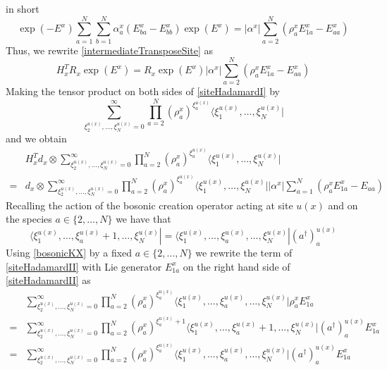 \documentclass[10pt]{article}
\numberwithin{equation}{section}
\numberwithin{equation}{subsection}
\begin{document}
in short
\begin{equation}\label{HadTransfBoundary}
\exp{(-E^{x})}\sum_{a=1}^{N}\sum_{b=1}^{N}\alpha_{a}^{x}\left(E_{b a}^{x}-E_{bb}^{x}\right)\exp{(E^{x})}=	|\alpha^{x}|\sum_{a=2}^{N}\left(\rho_{a}^{x}E_{1a}^{x}-E_{aa}^{x}\right)
\end{equation}
Thus, we rewrite \eqref{intermediateTransposeSite} as
\begin{equation}\label{siteHadamardI}
H_{x}^{T}R_{x}\exp{(E^{x})}=R_{x}\exp{(E^{x})}|\alpha^{x}|\sum_{a=2}^{N}\left(\rho_{a}^{x}E_{1a}^{x}-E_{aa}^{x}\right)
\end{equation}
Making the tensor product on both sides of \eqref{siteHadamardI} by 
\begin{equation}
\sum_{\xi_{2}^{u(x)},\ldots,\xi_{N}^{u(x)}=0}^{\infty}\prod_{a=2}^{N}\left(\rho_{a}^{x}\right)^{\xi_{a}^{u(x)}}\langle \xi_{1}^{u(x)},\ldots,\xi_{N}^{u(x)}|
\end{equation}
and we obtain 
\begin{equation}\label{siteHadamardII}
    \begin{split}
&H_{x}^{T}d_{x}\otimes\sum_{\xi_{2}^{u(x)},\ldots,\xi_{N}^{u(x)}=0}^{\infty}\prod_{a=2}^{N}\left(\rho_{a}^{x}\right)^{\xi_{a}^{u(x)}}\langle \xi_{1}^{u(x)},\ldots,\xi_{N}^{u(x)}|
\\=&
d_{x}\otimes \sum_{\xi_{2}^{u(x)},\ldots,\xi_{N}^{u(x)}=0}^{\infty}\prod_{a=2}^{N}\left(\rho_{a}^{x}\right)^{\xi_{a}^{u(x)}}\langle \xi_{1}^{u(x)},\ldots,\xi_{N}^{u(x)}||\alpha^{x}|\sum_{a=1}^{N}\left(\rho_{a}^{x}E_{1a}^{x}-E_{aa}\right)
    \end{split}
\end{equation}
Recalling the action of the bosonic creation operator acting at site $u(x)$ and on the species $a\in \{2,\ldots,N\}$ we have that 
\begin{equation}\label{bosonicKX}
    \langle \xi_{1}^{u(x)},\ldots,\xi_{a}^{u(x)}+1,\ldots,\xi_{N}^{u(x)}|=  \langle \xi_{1}^{u(x)},\ldots,\xi_{a}^{u(x)},\ldots,\xi_{N}^{u(x)}|(a^{\dagger})^{u(x)}_{a}
\end{equation}
Using \eqref{bosonicKX} by a fixed $a\in \{2,\ldots,N\}$ we rewrite the term of \eqref{siteHadamardII} with Lie generator $E_{1a}^{x}$ on the right hand side of \eqref{siteHadamardII} as 
\begin{equation}
    \begin{split}
&\sum_{\xi_{2}^{u(x)},\ldots,\xi_{N}^{u(x)}=0}^{\infty}\prod_{a=2}^{N}\left(\rho_{a}^{x}\right)^{\xi_{a}^{u(x)}}\langle \xi_{1}^{u(x)},\ldots,\xi_{a}^{u(x)},\ldots,\xi_{N}^{u(x)}|\rho_{a}^{x}E_{1a}^{x}
\\=&
\sum_{\xi_{2}^{u(x)},\ldots,\xi_{N}^{u(x)}=0}^{\infty}\prod_{a=2}^{N}\left(\rho_{a}^{x}\right)^{\xi_{a}^{u(x)}+1}\langle \xi_{1}^{u(x)},\ldots,\xi_{a}^{u(x)}+1,\ldots,\xi_{N}^{u(x)}|(a^{\dagger})_{a}^{u(x)}E_{1a}^{x}
\\=&
\sum_{\xi_{2}^{u(x)},\ldots,\xi_{N}^{u(x)}=0}^{\infty}\prod_{a=2}^{N}\left(\rho_{a}^{x}\right)^{\xi_{a}^{u(x)}}\langle \xi_{1}^{u(x)},\ldots,\xi_{a}^{u(x)},\ldots,\xi_{N}^{u(x)}|(a^{\dagger})_{a}^{u(x)}E_{1a}^{x}
    \end{split}
\end{equation}
\end{document}
